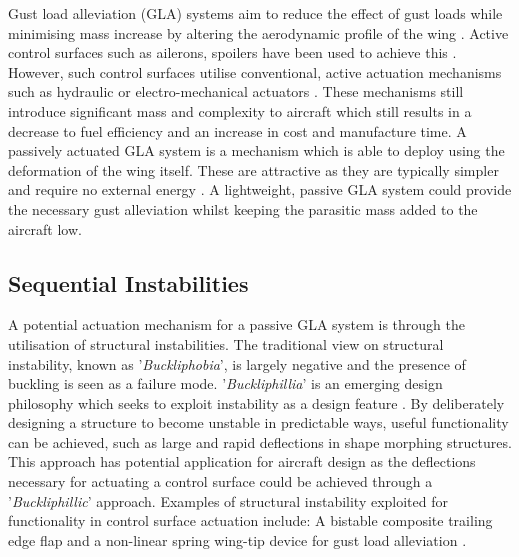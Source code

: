 \documentclass{IEEEtran}
\begin{document}
		Gust load alleviation (GLA) systems aim to reduce the effect of gust loads while minimising mass increase by altering the aerodynamic profile of the wing \cite{Li_2022}. Active control surfaces such as ailerons, spoilers have been used to achieve this \cite{Li_2022}. However, such control surfaces utilise conventional, active actuation mechanisms such as hydraulic or electro-mechanical actuators \cite{QI_2011}. These mechanisms still introduce significant mass and complexity to aircraft which still results in a decrease to fuel efficiency and an increase in cost and manufacture time. A passively actuated GLA system is a mechanism which is able to deploy using the deformation of the wing itself. These are attractive as they are typically simpler and require no external energy \cite{Li_2022}. A lightweight, passive GLA system could provide the necessary gust alleviation whilst keeping the parasitic mass added to the aircraft low.  
		
		\subsection{Sequential Instabilities}
		A potential actuation mechanism for a passive GLA system is through the utilisation of structural instabilities. The traditional view on structural instability, known as '\textit{Buckliphobia}', is largely negative and the presence of buckling is seen as a failure mode. '\textit{Buckliphillia}' is an emerging design philosophy which seeks to exploit instability as a design feature \cite{Reis_2015}. By deliberately designing a structure to become unstable in predictable ways, useful functionality can be achieved, such as large and rapid deflections in shape morphing structures. This approach has potential application for aircraft design as the deflections necessary for actuating a control surface could be achieved through a '\textit{Buckliphillic}' approach. Examples of structural instability exploited for functionality in control surface actuation include: A bistable composite trailing edge flap \cite{Daynes2010} and a non-linear spring wing-tip device for gust load alleviation \cite{Castrichini2017}.
		
\end{document}
